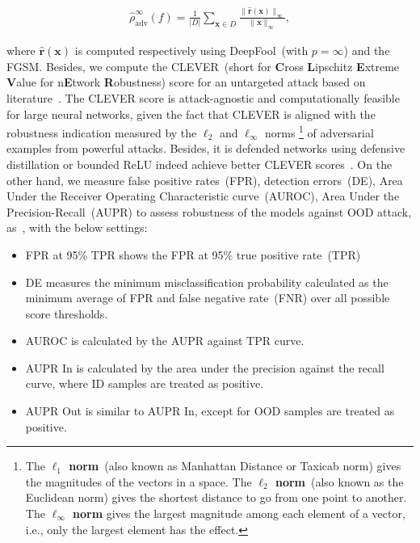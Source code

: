 \vspace{-4mm}
\begin{align}
    \hat{\rho}_{\mathrm{adv}}^{\infty}(f)=\frac{1}{|D|} \sum_{\boldsymbol{x} \in D} \frac{\|\hat{\boldsymbol{r}}(\boldsymbol{x})\|
    _{\infty}}{\|\boldsymbol{x}\|_{\infty}},
\end{align}

where $\hat{\boldsymbol{r}}(\boldsymbol{x})$ is
computed respectively using DeepFool~(with $p=\infty$) and the FGSM. Besides, we compute the CLEVER~(short for \textbf{C}ross \textbf{L}ipschitz \textbf{E}xtreme \textbf{V}alue for n\textbf{E}twork \textbf{R}obustness) score for an untargeted attack based on literature~\cite{weng2018evaluating}. 
The CLEVER score is attack-agnostic and computationally feasible for large neural networks, given the fact that CLEVER is aligned with the robustness indication measured by the $\ell_{2}$ and $\ell_{\infty}$ norms \footnote{The \textbf{$\ell_{1}$ norm}~(also known as Manhattan Distance or Taxicab norm) gives the magnitudes of the vectors in a space. The \textbf{$\ell_{2}$ norm}~(also known as the Euclidean norm) gives the shortest distance to go from one point to another. The \textbf{$\ell_{\infty}$ norm} gives the largest magnitude among each element of a vector, i.e., only the largest element has the effect.} of adversarial examples from powerful attacks. Besides, it is defended networks using defensive distillation or bounded ReLU indeed achieve better CLEVER scores~\cite{weng2018evaluating}. On the other hand, we measure false positive rates~(FPR), detection errors~(DE), Area Under the Receiver Operating Characteristic curve~(AUROC), Area Under the Precision-Recall~(AUPR) to assess robustness of the models against OOD attack, as~\cite{OOD19,OOD18}, with the below settings: 

\vspace{-2mm}
\begin{itemize}[noitemsep]
    \item FPR at 95\% TPR shows the FPR at 95\% true positive rate~(TPR)
    \item DE measures the minimum misclassification probability calculated as the minimum average of FPR and false negative rate~(FNR) over all possible score thresholds.
    \item AUROC is calculated by the AUPR against TPR curve.
    \item AUPR In is calculated by the area under the precision against the recall curve, where ID samples are treated as positive.
    \item AUPR Out is similar to AUPR In, except for OOD samples are treated as positive. 
\end{itemize}

